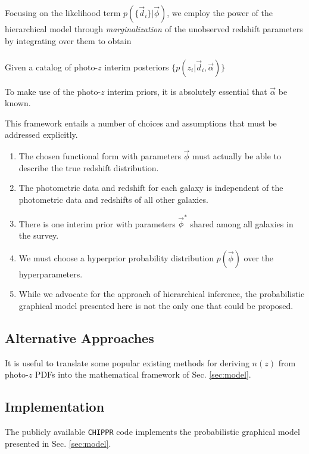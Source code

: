 \documentclass[iop]{emulateapj}
\newcommand{\chippr}{\texttt{CHIPPR} }
\begin{document}
Focusing on the likelihood term $p(\{\vec{d}_{i}\} | \vec{\phi})$, we employ 
the power of the hierarchical model through \textit{marginalization} of the 
unobserved redshift parameters by integrating over them to obtain 
\begin{align}
\end{align}


Given a catalog of photo-$z$ interim posteriors $\{p(z_{i} | \vec{d}_{i}, 
\vec{\alpha})\}$

To make use of the photo-$z$ interim priors, it is absolutely essential that 
$\vec{\alpha}$ be known.  

This framework entails a number of choices and assumptions that must be 
addressed explicitly.

\begin{enumerate}
	\item The chosen functional form with parameters $\vec{\phi}$ must 
actually be able to describe the true redshift distribution.
	\item The photometric data and redshift for each galaxy is independent 
of the photometric data and redshifts of all other galaxies.
	\item There is one interim prior with parameters $\vec{\phi}^{*}$ 
shared among all galaxies in the survey.
	\item We must choose a hyperprior probability distribution 
$p(\vec{\phi})$ over the hyperparameters.
	\item While we advocate for the approach of hierarchical inference, the 
probabilistic graphical model presented here is not the only one that could be 
proposed.
\end{enumerate}

\subsection{Alternative Approaches}
\label{sec:others}

It is useful to translate some popular existing methods for deriving $n(z)$ 
from photo-$z$ PDFs into the mathematical framework of Sec. \ref{sec:model}.

\subsection{Implementation}
\label{sec:implementation}

The publicly available \chippr code implements the probabilistic graphical 
model presented in Sec. \ref{sec:model}.  
\end{document}
